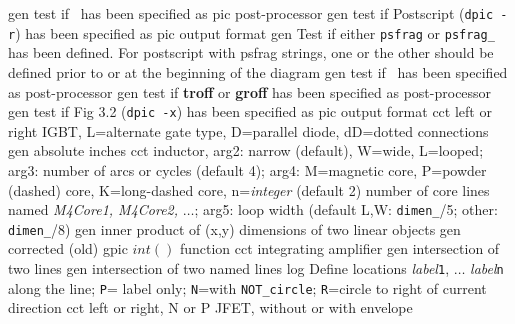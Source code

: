   {gen}
  {test if \TPGF~has been specified as pic post-processor}
  {gen}
  {test if Postscript ({\tt dpic -r}) has been specified as pic output format}
  {gen}
  {Test if either {\tt psfrag} or {\tt psfrag\_} has been defined. For
   postscript with psfrag strings, one or the other should be defined
   prior to or at the beginning of the diagram}
  {gen}
  {test if \PSTricks~has been specified as post-processor}
  {gen}
  {test if {\bf troff} or {\bf groff} has been specified as post-processor}
  {gen}
  {test if Fig 3.2 ({\tt dpic -x}) has been specified as pic output format}
  {cct}
  {left or right IGBT, L=alternate gate type, D=parallel diode,
   dD=dotted connections }
  {gen}
  {absolute inches}
  {cct}
  {inductor, arg2: narrow (default), W=wide, L=looped;
   arg3: number of arcs or cycles (default 4);
   arg4: M=magnetic core, P=powder (dashed) core, K=long-dashed core,
     n={\sl integer} (default 2) number of core lines named
     {\sl M4Core1, M4Core2,} $\ldots$;
   arg5: loop width (default L,W: {\tt dimen\_}/5; other: {\tt dimen\_}/8)
   }
  {gen}
  {inner product of (x,y) dimensions of two linear objects}
  {gen}
  {corrected (old) gpic $int()$ function}
  {cct}
  {integrating amplifier}
  {gen}
  {intersection of two lines}
  {gen}
  {intersection of two named lines}
  {log}
  {Define locations {\sl label}{\tt 1}, $\ldots$ {\sl label}{\tt n}
    along the line; {\tt P}= label only;
    {\tt N}=with {\tt NOT\_circle};
    {\tt R}=circle to right of current direction }
%
  {cct}
  {left or right, N or P JFET, without or with envelope
    }
